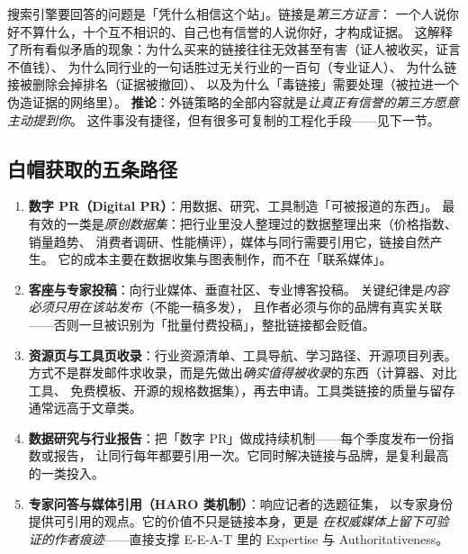 \begin{insight}
搜索引擎要回答的问题是「凭什么相信这个站」。链接是\emph{第三方证言}：
一个人说你好不算什么，十个互不相识的、自己也有信誉的人说你好，才构成证据。
这解释了所有看似矛盾的现象：为什么买来的链接往往无效甚至有害（证人被收买，证言不值钱）、
为什么同行业的一句话胜过无关行业的一百句（专业证人）、
为什么链接被删除会掉排名（证据被撤回）、
以及为什么「毒链接」需要处理（被拉进一个伪造证据的网络里）。
\textbf{推论}：外链策略的全部内容就是\emph{让真正有信誉的第三方愿意主动提到你}。
这件事没有捷径，但有很多可复制的工程化手段——见下一节。
\end{insight}

\subsection{白帽获取的五条路径}

\begin{enumerate}
  \item \textbf{数字 PR（Digital PR）}：用数据、研究、工具制造「可被报道的东西」。
        最有效的一类是\emph{原创数据集}：把行业里没人整理过的数据整理出来（价格指数、销量趋势、
        消费者调研、性能横评），媒体与同行需要引用它，链接自然产生。
        它的成本主要在数据收集与图表制作，而不在「联系媒体」。
  \item \textbf{客座与专家投稿}：向行业媒体、垂直社区、专业博客投稿。
        关键纪律是\emph{内容必须只用在该站发布}（不能一稿多发），
        且作者必须与你的品牌有真实关联——否则一旦被识别为「批量付费投稿」，整批链接都会贬值。
  \item \textbf{资源页与工具页收录}：行业资源清单、工具导航、学习路径、开源项目列表。
        方式不是群发邮件求收录，而是先做出\emph{确实值得被收录}的东西（计算器、对比工具、
        免费模板、开源的规格数据集），再去申请。工具类链接的质量与留存通常远高于文章类。
  \item \textbf{数据研究与行业报告}：把「数字 PR」做成持续机制——每个季度发布一份指数或报告，
        让同行每年都要引用一次。它同时解决链接与品牌，是复利最高的一类投入。
  \item \textbf{专家问答与媒体引用（HARO 类机制）}：响应记者的选题征集，
        以专家身份提供可引用的观点。它的价值不只是链接本身，更是
        \emph{在权威媒体上留下可验证的作者痕迹}——直接支撑 E-E-A-T 里的 Expertise 与 Authoritativeness。
\end{enumerate}

